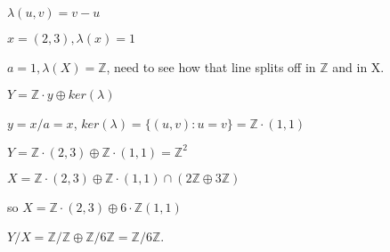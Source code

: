 \documentclass[12pt]{article}
\begin{document}
$\lambda(u, v) = v - u$

$x = (2, 3), \lambda(x) = 1$

$a = 1, \lambda(X) = \mathds{Z}$, need to see how that line splits off in $\mathds{Z}$ and in X.

$Y = \mathds{Z}\cdot y \oplus ker(\lambda)$

$y = x/a = x$, $ker(\lambda) = \{(u, v) : u = v\} = \mathds{Z} \cdot (1, 1)$

$Y = \mathds{Z} \cdot (2, 3) \oplus \mathds{Z} \cdot (1, 1) = \mathds{Z}^2$

$X = \mathds{Z} \cdot (2, 3) \oplus \mathds{Z} \cdot (1, 1) \cap (2\mathds{Z} \oplus 3\mathds{Z})$

so $X = \mathds{Z} \cdot (2, 3) \oplus 6 \cdot \mathds{Z}(1, 1)$

$Y/X = \mathds{Z}/\mathds{Z} \oplus \mathds{Z}/6\mathds{Z} = \mathds{Z}/6\mathds{Z}$.
\end{document}
